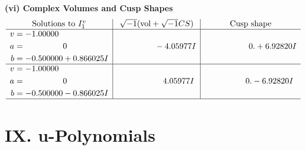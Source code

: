 \documentclass[1p]{elsarticle_modified}
\theoremstyle{definition}
\newcommand{\I}{\sqrt{-1}}
\begin{document}
\newpage\flushleft \textbf{(vi) Complex Volumes and Cusp Shapes}
$$\begin{array}{c|c|c}  
\text{Solutions to }I^v_{1}& \I (\text{vol} + \sqrt{-1}CS) & \text{Cusp shape}\\
 \hline 
\begin{aligned}
v &= -1.00000\phantom{ +0.000000I} \\
a &= \phantom{-0.000000 } 0 \\
b &= -0.500000 + 0.866025 I\end{aligned}
 & \phantom{-0.000000 } -4.05977 I & \phantom{-0.000000 -}0. + 6.92820 I \\ \hline\begin{aligned}
v &= -1.00000\phantom{ +0.000000I} \\
a &= \phantom{-0.000000 } 0 \\
b &= -0.500000 - 0.866025 I\end{aligned}
 & \phantom{-0.000000 -}4.05977 I & \phantom{-0.000000 } 0. - 6.92820 I\\
 \hline 
 \end{array}$$\newpage
\newpage\renewcommand{\arraystretch}{1}
\centering \section*{ IX. u-Polynomials}
\end{document}
